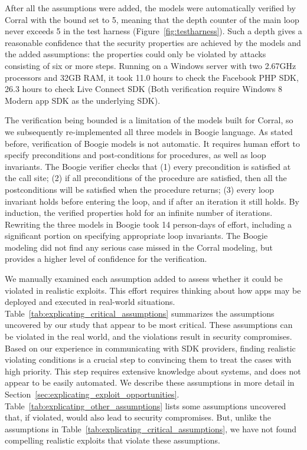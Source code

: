  After all the assumptions were added, the models were automatically verified by Corral with the bound set to 5, meaning that the depth counter of the main loop never exceeds 5 in the test harness (Figure~\ref{fig:testharness}).  Such a depth gives a reasonable confidence that the security properties are achieved by the models and the added assumptions: the properties could only be violated by attacks consisting of six or more steps. Running on a Windows server with two 2.67GHz processors and 32GB RAM, it took 11.0 hours to check the Facebook PHP SDK, 26.3 hours to check Live Connect SDK (Both verification require Windows 8 Modern app SDK as the underlying SDK).

  The verification being bounded is a limitation of the models built for Corral, so we subsequently re-implemented all three models in Boogie language.  As stated before, verification of Boogie models is not automatic.  It requires human effort to specify preconditions and post-conditions for procedures, as well as loop invariants.  The Boogie verifier checks that (1) every precondition is satisfied at the call site; (2) if all preconditions of the procedure are satisfied, then all the postconditions will be satisfied when the procedure returns; (3) every loop invariant holds before entering the loop, and if after an iteration it still holds.  By induction, the verified properties hold for an infinite number of iterations. Rewriting the three models in Boogie took 14 person-days of effort, including a significant portion on specifying appropriate loop invariants.  The Boogie modeling did not find any serious case missed in the Corral modeling, but provides a higher level of confidence for the verification.



  We manually examined each assumption added to assess whether it could be violated in realistic exploits.  This effort requires thinking about how apps may be deployed and executed in real-world situations.  Table~\ref{tab:explicating_critical_assumptions} summarizes the assumptions uncovered by our study that appear to be most critical.  These assumptions can be violated in the real world, and the violations result in security compromises.  Based on our experience in communicating with SDK providers, finding realistic violating conditions is a crucial step to convincing them to treat the cases with high priority.  This step requires extensive knowledge about systems, and does not appear to be easily automated.  We describe these assumptions in more detail in Section~\ref{sec:explicating_exploit_opportunities}.  Table~\ref{tab:explicating_other_assumptions} lists some assumptions uncovered that, if violated, would also lead to security compromises.  But, unlike the assumptions in Table~\ref{tab:explicating_critical_assumptions}, we have not found compelling realistic exploits that violate these assumptions.  

